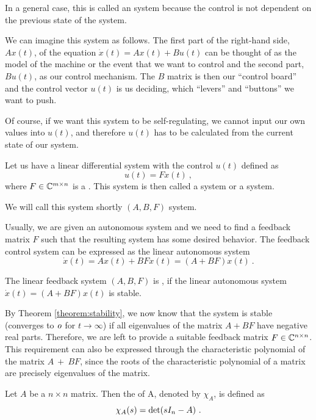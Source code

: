 In a general case, this is called an  system because the control is not dependent on the previous state of the system.

We can imagine this system as follows. The first part of the right-hand side, $Ax(t)$, of the equation $\dot{x}(t)=Ax(t)+Bu(t)$ can be thought of as the model of the machine or the event that we want to control and the second part, $Bu(t)$, as our control mechanism. The $B$ matrix is then our ``control board'' and the control vector $u(t)$ is us deciding, which ``levers'' and ``buttons'' we want to push. 

Of course, if we want this system to be self-regulating, we cannot input our own values into $u(t)$, and therefore $u(t)$ has to be calculated from the current state of our system.

\begin{definition}
	Let us have a linear differential system with the control $u(t)$ defined as
	$$u(t)=Fx(t)\ ,$$
	where $F\in\mathbb{C}^{m\times n}$ is a . This system is then called a  system or a  system.

	We will call this system shortly $(A,B,F)$ system.
\end{definition}

Usually, we are given an autonomous system and we need to find a feedback matrix $F$ such that the resulting system has some desired behavior. The feedback control system can be expressed as the linear autonomous system
$$\dot{x}(t)=Ax(t)+BFx(t)=(A+BF)x(t)\ .$$

\begin{definition}
	The linear feedback system $(A,B,F)$ is , if the linear autonomous system $\dot{x}(t)=(A+BF)x(t)$ is stable.
\end{definition}

By Theorem \ref{theorem:stability}, we now know that the system is stable (converges to $\textit{o}$ for $t\to\infty$) if all eigenvalues of the matrix $A+BF$ have negative real parts. Therefore, we are left to provide a suitable feedback matrix $F \in \mathbb{C}^{n \times n}$. This requirement can also be expressed through the characteristic polynomial of the matrix $A~+~BF$, since the roots of the characteristic polynomial of a matrix are precisely eigenvalues of the matrix.

\begin{definition}
	Let $A$ be a $n\times n$ matrix. Then the  of A, denoted by $\chi_A$, is defined as $$\chi_A(s)=\textnormal{det}(sI_n-A)\ .$$
\end{definition}

